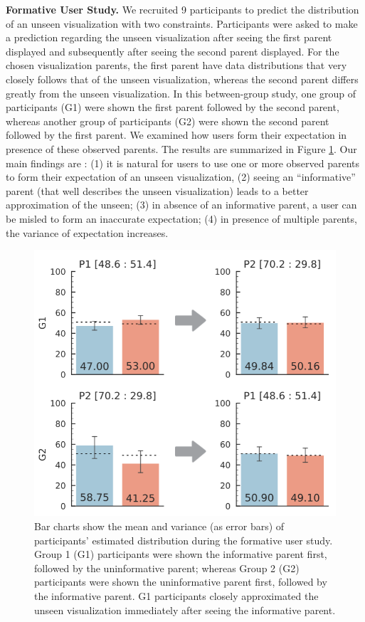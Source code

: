 \textbf{Formative User Study.} %
We recruited 9 participants to predict the distribution of an unseen visualization with two constraints. Participants were asked to make a prediction regarding the unseen visualization after seeing the first parent displayed and subsequently after seeing the second parent displayed. For the chosen visualization parents, the first parent have data distributions that very closely follows that of the unseen visualization, whereas the second parent differs greatly from the unseen visualization. In this between-group study, one group of participants (G1) were shown the first parent followed by the second parent, whereas another group of participants (G2) were shown the second parent followed by the first parent. We examined how users form their expectation in presence of these observed parents. The results are summarized in Figure \ref{fig:formative_study}. Our main findings are : (1) it is natural for users to use one or more observed parents to form their expectation of an unseen visualization, (2) seeing an ``informative'' parent (that well describes the unseen visualization) leads to a better approximation of the unseen; (3) in absence of an informative parent, a user can be misled to form an inaccurate expectation; (4) in presence of multiple parents, the variance of expectation increases.
\begin{figure}[bht]
\centering
\includegraphics[width=\linewidth]{figures/Formative_Study.png}
\caption{Bar charts show the mean and variance (as error bars) of participants' estimated distribution during the formative user study. Group 1 (G1) participants were shown the informative parent first, followed by the uninformative parent; whereas Group 2 (G2) participants were shown the uninformative parent first, followed by the informative parent. G1 participants closely approximated the unseen visualization immediately after seeing the informative parent.}
\label{fig:formative_study}
\end{figure}


